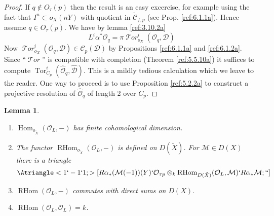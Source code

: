 \documentclass{amsproc}
\def\Cscr{{\mathcal C}}
\def\Dscr{{\mathcal D}}
\def\Mscr{{\mathcal M}}
\def\Oscr{{\mathcal O}}
\def\Tscr{{\mathcal T}}
\def\HTor{\operatorname {\Tscr \mathit{or}}}
\def\Hom{\operatorname {Hom}}
\def\RHom{\operatorname {RHom}}
\def\HTor{\operatorname {\Tscr \mathit{or}}}
\def\Tor{\operatorname {Tor}}
\newtheorem{lemmas}{Lemma}[subsection]
\theoremstyle{definition}
\theoremstyle{remark}
\numberwithin{equation}{section}
\numberwithin{table}{section}
\numberwithin{figure}{section}
\begin{document}
\begin{proof}
If $q\not \in O_\tau (p)$ then the result is an easy excercise, for
example using the fact that $I^n\subset o_X(nY)$ with quotient in
$\tilde{\Cscr}_{f,p}$ (see Prop. \ref{ref:6.1.1a}). 
Hence assume $q\in O_\tau(p)$.
We have by lemma \ref{ref:3.10.2a}
\[
L^i\alpha^\ast \Oscr_q=\pi \HTor^i_{o_X}(\Oscr_q,\Dscr)
\]
Now $\HTor^i_{o_X}(\Oscr_q,\Dscr)\in\Cscr_p(\Dscr)$ by Propositions
\ref{ref:6.1.1a} and \ref{ref:6.1.2a}. Since ``$\HTor$''
is compatible with completion (Theorem \ref{ref:5.5.10a})
it suffices to compute $\Tor^i_{C_p}(\hat{\Oscr}_q,\hat{\Dscr})$. This
is a mildly tedious calculation which we leave to the reader. One way
to proceed is to use Proposition \ref{ref:5.2.2a}
to construct a projective resolution of $\hat{\Oscr}_q$ of length 2
over $C_p$.
\end{proof}
\begin{lemmas}
\label{ref:8.3.3a}
\begin{enumerate} 
\item $\Hom_{o_{\tilde{X}}}(\Oscr_L,-)$ has finite cohomological dimension.
\item
The functor $\RHom_{o_{\tilde{X}}}(\Oscr_L,-)$ is defined on
$D(\tilde{X})$. For $\Mscr\in D(X)$ there is a triangle
\begin{equation}
\label{ref:8.7a}
\Atriangle<1`-1`1; >[R\alpha_\ast(\Mscr(- 1))(Y)`
\Oscr_{\tau p}\otimes_k\RHom_{D(\tilde{X})}(\Oscr_L,\Mscr)`R\alpha_\ast\Mscr;``]
\end{equation}
\item $\RHom(\Oscr_L,-)$ commutes with direct sums on $D(X)$.
\item $\RHom(\Oscr_L,\Oscr_L)=k$.
\end{enumerate}
\end{lemmas}
\end{document}
